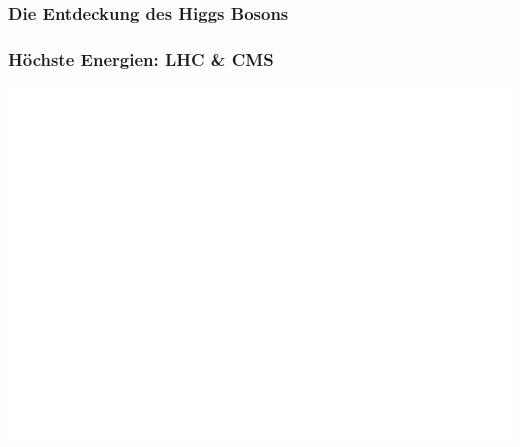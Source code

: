 \documentclass[14pt]{beamer}
\begin{document}
\begin{frame}
	\frametitle{Die Entdeckung des Higgs Bosons}
	\begin{center}
	\end{center}
\end{frame}

\begin{frame}
	\frametitle{Höchste Energien: LHC \& CMS}
	\begin{center}
		\includegraphics[width=\textwidth]{dimuon.png}
	\end{center}
\end{frame}
\end{document}
